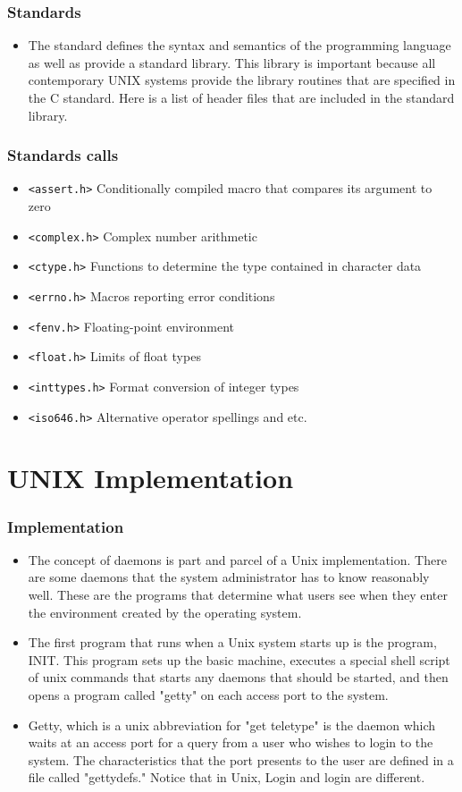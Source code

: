 \documentclass[newPxFont,sthlmFooter,nooffset]{beamer}
\begin{document}
\begin{frame}[t]
	\frametitle{Standards}
	\begin{itemize}
		\item The standard defines the syntax and semantics of the programming language as well as provide a standard library. This library is important because all contemporary UNIX systems provide the library routines that are specified in the C standard. Here is a list of header files that are included in the standard library.
	\end{itemize}
\end{frame}

\begin{frame}[t]
  \frametitle{Standards calls}
  \begin{itemize}
  \item \texttt{<assert.h>} Conditionally compiled macro that compares its argument to zero
\item \texttt{<complex.h>} Complex number arithmetic
\item \texttt{<ctype.h>} Functions to determine the type contained in character data
\item \texttt{<errno.h>} Macros reporting error conditions
\item \texttt{<fenv.h>} Floating-point environment
\item \texttt{<float.h>} Limits of float types
\item \texttt{<inttypes.h>} Format conversion of integer types
\item \texttt{<iso646.h>} Alternative operator spellings and etc.
  \end{itemize}
\end{frame}

\section{UNIX Implementation}
	\begin{frame}[t]
		\frametitle{Implementation}
		\begin{itemize}
\item The concept of daemons is part and parcel of a Unix implementation. There are some daemons that the system administrator has to know reasonably well. These are the programs that determine what users see when they enter the environment created by the operating system.

\item The first program that runs when a Unix system starts up is the program, INIT. This program sets up the basic machine, executes a special shell script of unix commands that starts any daemons that should be started, and then opens a program called "getty" on each access port to the system.

\item Getty, which is a unix abbreviation for "get teletype" is the daemon which waits at an access port for a query from a user who wishes to login to the system. The characteristics that the port presents to the user are defined in a file called "gettydefs." Notice that in Unix, Login and login are different.
		\end{itemize}
	\end{frame}
\end{document}
